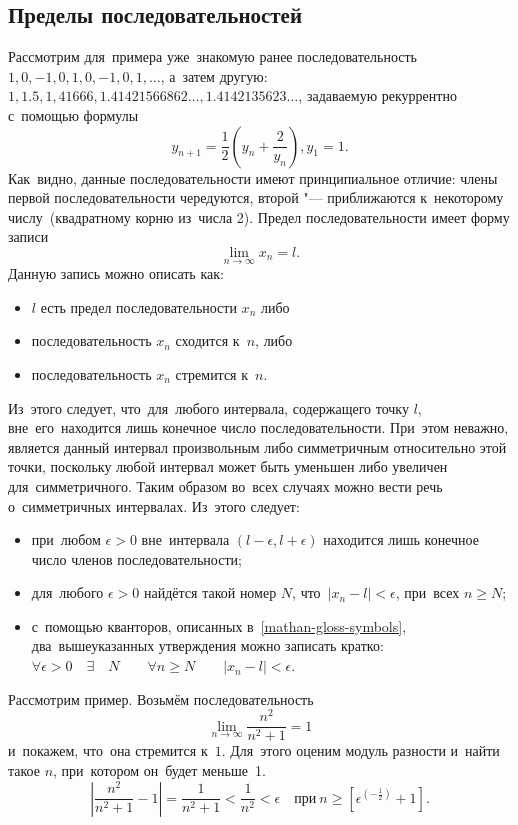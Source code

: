 \documentclass[]{scrartcl}
\begin{document}
{{\subsection{Пределы последовательностей}
Рассмотрим для~примера уже~знакомую ранее последовательность $1, 0, -1, 0, 1, 0, -1, 0, 1,\ldots$, а~затем другую: $1, 1.5, 1,41666, 1.41421566862\ldots, 1.4142135623\ldots$, задаваемую рекуррентно с~помощью формулы
\begin{equation}\label{eq:recurr}
y_{n+1}=\frac{1}{2}(y_n+\frac{2}{y_n}), y_1=1.
\end{equation}
Как~видно, данные последовательности имеют принципиальное отличие: члены первой последовательности чередуются, второй "--- приближаются к~некоторому числу~(квадратному корню из~числа 2).
Предел последовательности имеет форму записи
\begin{equation}\label{eq:limit1}
\lim_{n\to\infty}x_n=l.
\end{equation}
Данную запись можно описать как:
\begin{itemize}
	\item $l$ есть предел последовательности $x_n$ либо
	\item последовательность $x_n$ сходится к~$n$, либо
	\item последовательность $x_n$ стремится к~$n$.
\end{itemize}
Из~этого следует, что~для~любого интервала, содержащего точку $l$, вне~его~находится лишь конечное число последовательности. При~этом неважно, является данный интервал произвольным либо симметричным относительно этой точки, поскольку любой интервал может быть уменьшен либо увеличен для~симметричного. Таким образом во~всех случаях можно вести речь о~симметричных интервалах. Из~этого следует:
\begin{itemize}
	\item при~любом $\epsilon > 0$ вне~интервала $(l-\epsilon, l+\epsilon)$ находится лишь конечное число членов последовательности;
	\item для~любого $\epsilon > 0$ найдётся такой номер $N$, что~$|x_n-l| < \epsilon$, при~всех $n \geq N$;
	\item с~помощью кванторов, описанных в~\ref{mathan-gloss-symbols}, два~вышеуказанных утверждения можно записать кратко: $\forall \epsilon > 0 \quad \exists \quad N \qquad \forall n \geq N \qquad |x_n-l|<\epsilon$.
\end{itemize}
Рассмотрим пример. Возьмём последовательность
\begin{equation}\label{eq:limits2}
\lim_{n\to\infty}\frac{n^2}{n^2+1}=1
\end{equation}
и~покажем, что~она стремится к~$1$. Для~этого оценим модуль разности и~найти такое $n$, при~котором он~будет меньше~1.
\begin{equation}\label{eq:limits3}
|\frac{n^2}{n^2+1}-1|=\frac{1}{n^2+1}<\frac{1}{n^2}<\epsilon \quad \text{при}~n \geq [\epsilon^{(-\frac{1}{2})}+1].
\end{equation}


}}
\end{document}
